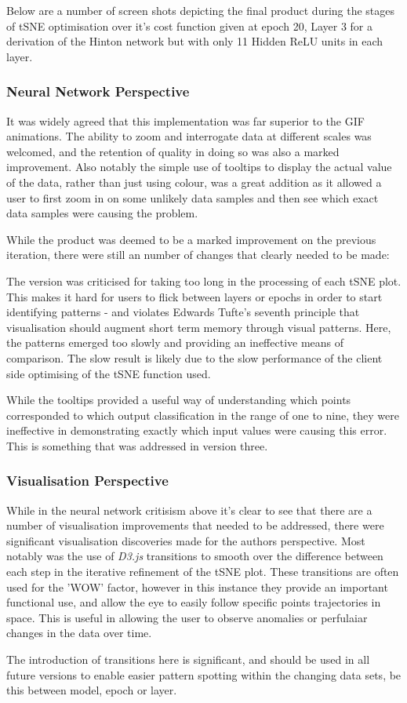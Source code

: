 \documentclass[a4paper,11pt,titlepage]{article}
\begin{document}
	Below are a number of screen shots depicting the final product during the stages of tSNE optimisation over it's cost function given at epoch 20,  Layer 3 for a derivation of the Hinton network but with only 11 Hidden ReLU units in each layer.
	
		
		\subsubsection{Neural Network Perspective}
		It was widely agreed that this implementation was far superior to the GIF animations. The ability to zoom and interrogate data at different scales was welcomed, and the retention of quality in doing so was also a marked improvement. Also notably the simple use of tooltips to display the actual value of the data, rather than just using colour, was a great addition as it allowed a user to first zoom in on some unlikely data samples and then see which exact data samples were causing the problem.
		\par 
		While the product was deemed to be a marked improvement on the previous iteration, there were still an number of changes that clearly needed to be made:
		\par 
		The version was criticised for taking too long in the processing of each tSNE plot. This makes it hard for users to flick between layers or epochs in order to start identifying patterns - and violates Edwards Tufte's seventh principle that visualisation should augment short term memory through visual patterns. Here, the patterns emerged too slowly and providing an ineffective means of comparison. The slow result is likely due to the slow performance of the client side optimising of the tSNE function used. 
		\par 
		While the tooltips provided a useful way of understanding which points corresponded to which output classification in the range of one to nine, they were ineffective in demonstrating exactly which input values were causing this error. This is something that was addressed in version three.
		
		\subsubsection{Visualisation Perspective}
		While in the neural network critisism above it's clear to see that there are a number of visualisation improvements that needed to be addressed, there were significant visualisation discoveries made for the authors perspective. Most notably was the use of \textit{D3.js} transitions to smooth over the difference between each step in the iterative refinement of the tSNE plot. These transitions are often used for the 'WOW' factor, however in this instance they provide an important functional use, and allow the eye to easily follow specific points trajectories in space. This is useful in allowing the user to observe anomalies or perfulaiar changes in the data over time.	
		\par 
		The introduction of transitions here is significant, and should be used in all future versions to enable easier pattern spotting within the changing data sets, be this between model, epoch or layer.
	
\end{document}
